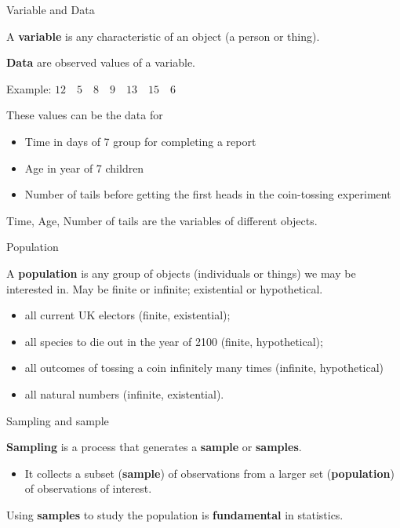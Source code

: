 \documentclass{beamer}
\newcommand{\blue}{\color{blue}}
\begin{document}
\begin{frame}{Variable and Data}

A {\bf variable} is any characteristic of an object (a person or thing).

{\bf Data} are observed values of a variable.


Example: $12\quad 5\quad 8\quad 9\quad 13\quad 15\quad 6$


These values can be the data for
\begin{itemize}
\item {\blue Time} in days of 7 group for completing a report
\item {\blue Age} in year of 7 children 
\item {\blue Number of tails} before getting the first heads in the coin-tossing experiment 
\end{itemize}

{\blue Time, Age, Number of tails} are the variables of different objects. 
\end{frame}

\begin{frame}{Population}

A {\bf population} is any group of objects (individuals or things) we may be interested in.
May be finite or infinite; existential or hypothetical. 


\begin{itemize}
\item all current UK electors (finite, existential);
\item all species to die out in the year of 2100 (finite, hypothetical); 
\item all outcomes of tossing a coin infinitely many times (infinite, hypothetical)
\item all natural numbers (infinite, existential).
\end{itemize}
\end{frame}


\begin{frame}{Sampling and sample}

{\bf Sampling} is a process that generates a {\bf sample} or {\bf samples}.
\begin{itemize}
\item[$\rhd$] It collects a subset  ({\bf sample}) of observations from a larger set ({\bf population}) of observations of interest. 
\end{itemize}

Using {\bf samples} to study the population is {\bf fundamental} in statistics. 
\end{frame}
\end{document}
